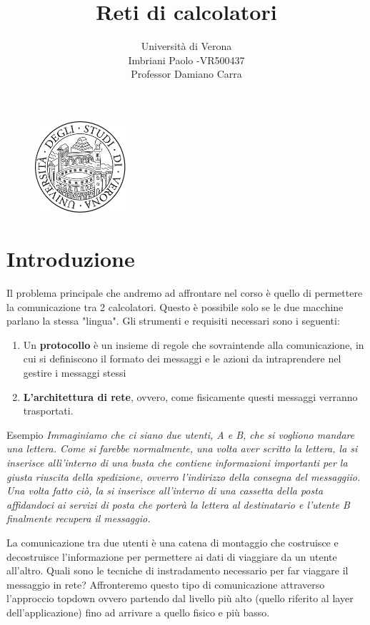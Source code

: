 \documentclass[a4paper]{article}
\title{Reti di calcolatori}
\author{Università di Verona\\Imbriani Paolo -VR500437\\Professor Damiano Carra}
\begin{document}
\begin{figure}
    \centering
    \includegraphics[width=0.3\textwidth]{UniversityofVerona.png}
    \label{fig:centered-image}
\end{figure}

\maketitle 

\pagebreak

\tableofcontents

\pagebreak

\section{Introduzione}


Il problema principale che andremo ad affrontare nel corso è quello di permettere la comunicazione tra 2 calcolatori. Questo è possibile solo se le due macchine parlano la stessa "lingua". Gli strumenti e requisiti necessari sono i seguenti: 

\begin{enumerate}
    \item Un \textbf{protocollo} è un insieme di regole che sovraintende alla comunicazione, in cui si definiscono il formato dei messaggi e le azioni da intraprendere nel gestire i messaggi stessi
    \item \textbf{L'architettura di rete}, ovvero, come fisicamente questi messaggi verranno trasportati. 
\end{enumerate}
\begin{examplebox}{Esempio}
\textit{Immaginiamo che ci siano due utenti, A e B, che si vogliono mandare una lettera. Come si farebbe normalmente, una volta aver scritto la lettera, la si inserisce allì'interno di una busta che contiene informazioni importanti per la giusta riuscita della spedizione, ovverro l'indirizzo della consegna del messaggiio. Una volta fatto ciò, la si inserisce all'interno di una cassetta della posta affidandoci ai servizi di posta che porterà la lettera al destinatario e l'utente B finalmente recupera il messaggio.}
\end{examplebox}
La comunicazione tra due utenti è una catena di montaggio che costruisce e decostruisce l'informazione per permettere ai dati di viaggiare da un utente all'altro. Quali sono le tecniche di instradamento necessario per far viaggare il messaggio in rete? 
Affronteremo questo tipo di comunicazione attraverso l'approccio topdown ovvero partendo dal livello più alto (quello riferito al layer dell'applicazione) fino ad arrivare a quello fisico e più basso.
\end{document}
